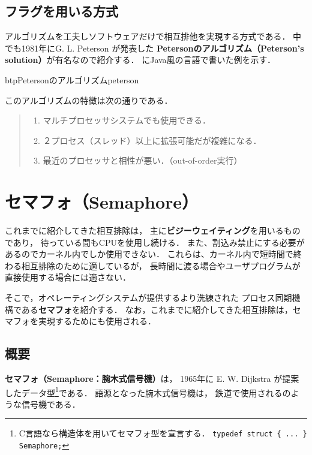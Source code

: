 \subsection{フラグを用いる方式}
アルゴリズムを工夫しソフトウェアだけで相互排他を実現する方式である．
中でも1981年にG. L. Peterson が発表した
{\bf Petersonのアルゴリズム（Peterson's solution）}が有名なので紹介する．
にJava風の言語で書いた例を示す．

\begin{myfig}{btp}{Petersonのアルゴリズム}{peterson}

\end{myfig}

このアルゴリズムの特徴は次の通りである．

\begin{quote}
\begin{enumerate}
\item マルチプロセッサシステムでも使用できる．
\item ２プロセス（スレッド）以上に拡張可能だが複雑になる．
\item 最近のプロセッサと相性が悪い．（out-of-order実行）
\end{enumerate}
\end{quote}

\section{セマフォ（Semaphore）}
これまでに紹介してきた相互排除は，
主に{\bf ビジーウェイティング}を用いるものであり，
待っている間もCPUを使用し続ける．
また、割込み禁止にする必要があるのでカーネル内でしか使用できない．
これらは、カーネル内で短時間で終わる相互排除のために適しているが，
長時間に渡る場合やユーザプログラムが直接使用する場合には適さない．

そこで，オペレーティングシステムが提供するより洗練された
プロセス同期機構である{\bf セマフォ}を紹介する．
なお，これまでに紹介してきた相互排除は，セマフォを実現するためにも使用される．

\subsection{概要}
{\bf セマフォ（Semaphore：腕木式信号機）}は，
1965年に E. W. Dijkstra が提案したデータ型\footnote{
C言語なら構造体を用いてセマフォ型を宣言する．
{\tt typedef struct \{ ... \} Semaphore;}
}である．
語源となった腕木式信号機は，
鉄道で使用されるのような信号機である．

